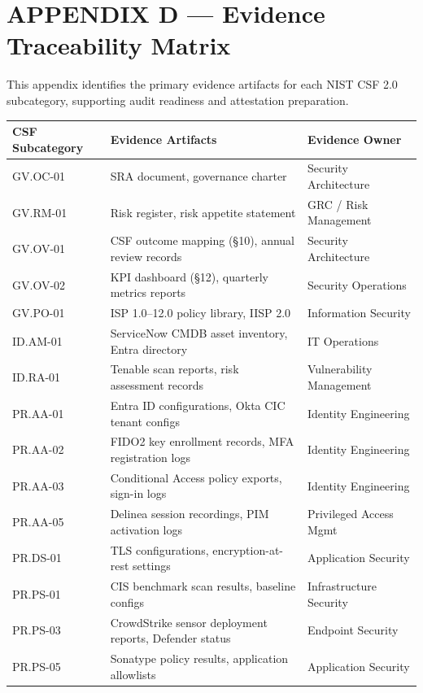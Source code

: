 \documentclass[11pt,landscape]{article}
\begin{document}
\newpage

\section{APPENDIX D --- Evidence Traceability Matrix}
\label{app:evidence}

This appendix identifies the primary evidence artifacts for each NIST CSF 2.0 subcategory,
supporting audit readiness and attestation preparation.

\vspace{0.3cm}

\begin{longtable}{lp{3.5in}p{2in}}
\toprule
\textbf{CSF Subcategory} & \textbf{Evidence Artifacts} & \textbf{Evidence Owner} \\
\midrule
\endhead
GV.OC-01 & SRA document, governance charter & Security Architecture \\
GV.RM-01 & Risk register, risk appetite statement & GRC / Risk Management \\
GV.OV-01 & CSF outcome mapping (§10), annual review records & Security Architecture \\
GV.OV-02 & KPI dashboard (§12), quarterly metrics reports & Security Operations \\
GV.PO-01 & ISP 1.0–12.0 policy library, IISP 2.0 & Information Security \\
ID.AM-01 & ServiceNow CMDB asset inventory, Entra directory & IT Operations \\
ID.RA-01 & Tenable scan reports, risk assessment records & Vulnerability Management \\
PR.AA-01 & Entra ID configurations, Okta CIC tenant configs & Identity Engineering \\
PR.AA-02 & FIDO2 key enrollment records, MFA registration logs & Identity Engineering \\
PR.AA-03 & Conditional Access policy exports, sign-in logs & Identity Engineering \\
PR.AA-05 & Delinea session recordings, PIM activation logs & Privileged Access Mgmt \\
PR.DS-01 & TLS configurations, encryption-at-rest settings & Application Security \\
PR.PS-01 & CIS benchmark scan results, baseline configs & Infrastructure Security \\
PR.PS-03 & CrowdStrike sensor deployment reports, Defender status & Endpoint Security \\
PR.PS-05 & Sonatype policy results, application allowlists & Application Security \\

\end{longtable}
\end{document}

